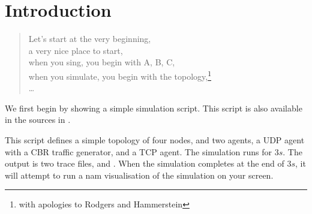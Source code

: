 
\chapter{Introduction}

\begin{quote}
Let's start at the very beginning, \\
a very nice place to start, \\
when you sing, you begin with A, B, C, \\
when you simulate, you begin with the topology,\footnote{%
with apologies to Rodgers and Hammerstein}\\
\ldots
\end{quote}

We first begin by showing a simple simulation script.
This script is also available in the sources in
.

This script defines a simple topology of four nodes,
and two agents, a UDP agent with a CBR traffic generator, and a TCP agent.
The simulation runs for $3s$.  The output is two trace files,
 and .
When the simulation completes at the end of $3s$,
it will attempt to run a nam visualisation of the simulation on your
screen.

